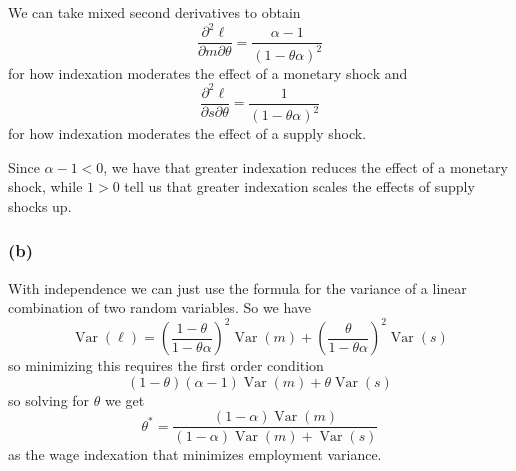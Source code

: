 \documentclass[11pt]{amsart}
\begin{document}
We can take mixed second derivatives to obtain
\[
\frac{\partial^2 \ell}{\partial m \partial \theta} = \frac{\alpha - 1}{(1-\theta \alpha)^2}
\]
for how indexation moderates the effect of a monetary shock and
\[
\frac{\partial^2 \ell}{\partial s \partial \theta} = \frac{1}{(1-\theta \alpha)^2}
\]
for how indexation moderates the effect of a supply shock.

Since $\alpha - 1 < 0$, we have that greater indexation reduces the effect of a monetary shock, while $1 > 0$ tell us that greater indexation scales the effects of supply shocks up.

\subsubsection*{(b)}

With independence we can just use the formula for the variance of a linear combination of two random variables. So we have
\[
\operatorname{Var}(\ell) = \left(\frac{1-\theta}{1-\theta \alpha}\right)^2 \operatorname{Var}(m) + \left(\frac{\theta}{1-\theta \alpha}\right)^2 \operatorname{Var}(s)
\]
so minimizing this requires the first order condition
\[
(1-\theta)(\alpha-1) \operatorname{Var}(m) + \theta \operatorname{Var}(s)
\]
so solving for $\theta$ we get
\[
\theta^* = \frac{(1-\alpha) \operatorname{Var}(m)}{(1-\alpha) \operatorname{Var}(m) + \operatorname{Var}(s)}
\]
as the wage indexation that minimizes employment variance.
\end{document}
